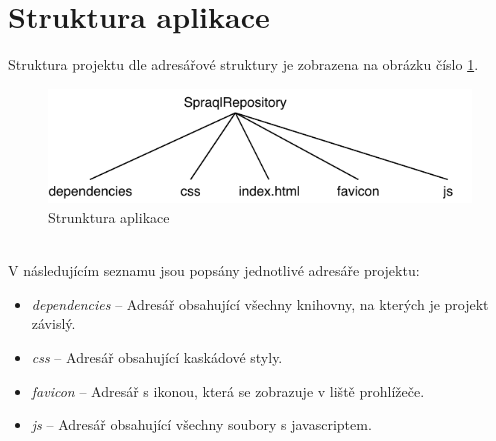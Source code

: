 \documentclass[
12pt,
a4paper,
pdftex,
czech,
titlepage
]{report}
\begin{document}
\section{Struktura aplikace}	
Struktura projektu dle adresářové struktury je zobrazena na obrázku číslo \ref{img_struc}.					
\begin{figure}[h]
	\centering
	\includegraphics[scale=1.0]{img/file_tree.pdf}
	\caption{Strunktura aplikace}
	\label{img_struc}
\end{figure}
\\
V následujícím seznamu jsou popsány jednotlivé adresáře projektu:
\begin{itemize}
	\item \textit{dependencies} -- Adresář obsahující všechny knihovny, na kterých je projekt závislý.
	\item \textit{css} -- Adresář obsahující kaskádové styly.
	\item \textit{favicon} -- Adresář s ikonou, která se zobrazuje v liště prohlížeče.
	\item \textit{js} -- Adresář obsahující všechny soubory s javascriptem.
\end{itemize}
\end{document}
